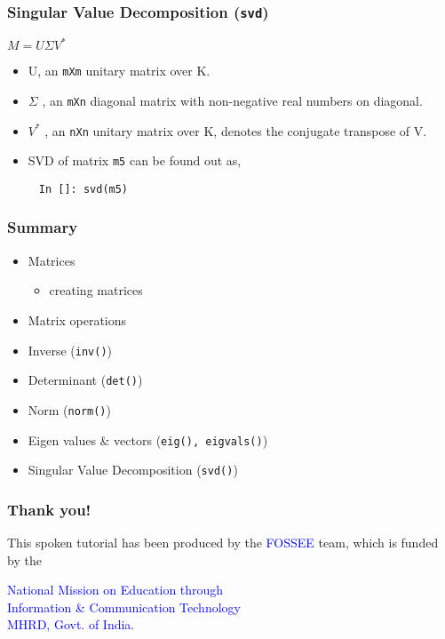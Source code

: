 \documentclass[presentation]{beamer}
\begin{document}
\begin{frame}[fragile]
\frametitle{Singular Value Decomposition (\texttt{svd})}
\label{sec-15}

    $M = U \Sigma V^*$
\begin{itemize}
\item U, an \texttt{mXm} unitary matrix over K.
\item $\Sigma$
        , an \texttt{mXn} diagonal matrix with non-negative real numbers on diagonal.
\item $V^*$
        , an \texttt{nXn} unitary matrix over K, denotes the conjugate transpose of V.
\item SVD of matrix \texttt{m5} can be found out as,
\end{itemize}

\begin{verbatim}
     In []: svd(m5)
\end{verbatim}
\end{frame}
\begin{frame}
\frametitle{Summary}
\label{sec-16}

\begin{itemize}
\item Matrices

\begin{itemize}
\item creating matrices
\end{itemize}

\item Matrix operations
\item Inverse (\texttt{inv()})
\item Determinant (\texttt{det()})
\item Norm (\texttt{norm()})
\item Eigen values \& vectors (\texttt{eig(), eigvals()})
\item Singular Value Decomposition (\texttt{svd()})
\end{itemize}
\end{frame}
\begin{frame}
\frametitle{Thank you!}
\label{sec-17}

  \begin{block}{}
  \begin{center}
  This spoken tutorial has been produced by the
  \textcolor{blue}{FOSSEE} team, which is funded by the 
  \end{center}
  \begin{center}
    \textcolor{blue}{National Mission on Education through \\
      Information \& Communication Technology \\ 
      MHRD, Govt. of India}.
  \end{center}  
  \end{block}

  
\end{frame}
\end{document}
